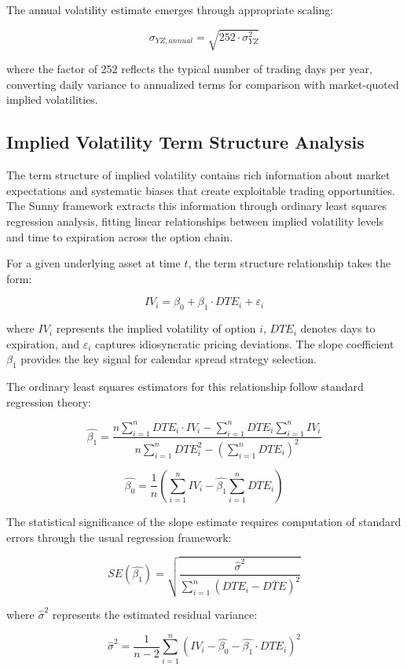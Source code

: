 \documentclass[
  american,
  11pt,
  11pt,
  letterpaper,
  onecolumn]{article}
\begin{document}
The annual volatility estimate emerges through appropriate scaling:

\[\sigma_{YZ,annual} = \sqrt{252 \cdot \sigma_{YZ}^2}\]

where the factor of 252 reflects the typical number of trading days per
year, converting daily variance to annualized terms for comparison with
market-quoted implied volatilities.

\subsection{Implied Volatility Term Structure
Analysis}\label{implied-volatility-term-structure-analysis}

The term structure of implied volatility contains rich information about
market expectations and systematic biases that create exploitable
trading opportunities. The Sunny framework extracts this information
through ordinary least squares regression analysis, fitting linear
relationships between implied volatility levels and time to expiration
across the option chain.

For a given underlying asset at time \(t\), the term structure
relationship takes the form:

\[IV_i = \beta_0 + \beta_1 \cdot DTE_i + \varepsilon_i\]

where \(IV_i\) represents the implied volatility of option \(i\),
\(DTE_i\) denotes days to expiration, and \(\varepsilon_i\) captures
idiosyncratic pricing deviations. The slope coefficient \(\beta_1\)
provides the key signal for calendar spread strategy selection.

The ordinary least squares estimators for this relationship follow
standard regression theory:

\[\hat{\beta_1} = \frac{n\sum_{i=1}^{n} DTE_i \cdot IV_i - \sum_{i=1}^{n} DTE_i \sum_{i=1}^{n} IV_i}{n\sum_{i=1}^{n} DTE_i^2 - \left(\sum_{i=1}^{n} DTE_i\right)^2}\]

\[\hat{\beta_0} = \frac{1}{n}\left(\sum_{i=1}^{n} IV_i - \hat{\beta_1}\sum_{i=1}^{n} DTE_i\right)\]

The statistical significance of the slope estimate requires computation
of standard errors through the usual regression framework:

\[SE(\hat{\beta_1}) = \sqrt{\frac{\hat{\sigma}^2}{\sum_{i=1}^{n}(DTE_i - \overline{DTE})^2}}\]

where \(\hat{\sigma}^2\) represents the estimated residual variance:

\[\hat{\sigma}^2 = \frac{1}{n-2}\sum_{i=1}^{n}(IV_i - \hat{\beta_0} - \hat{\beta_1} \cdot DTE_i)^2\]
\end{document}
